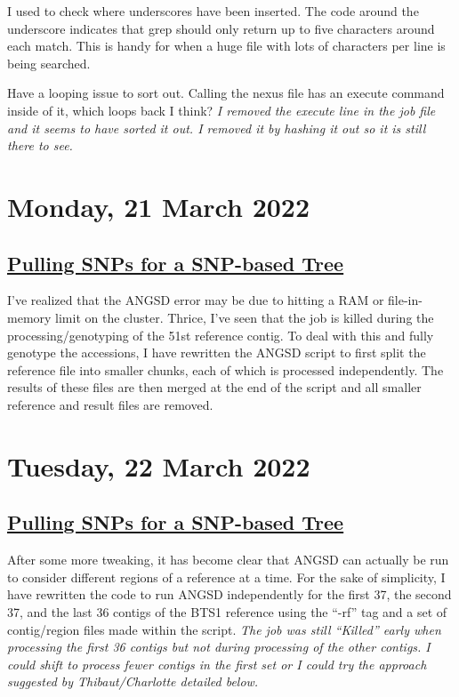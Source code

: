 \documentclass[12pt]{report}
\begin{document}
I used \verb!! to check where underscores have been inserted. The code around the underscore indicates that grep should only return up to five characters around each match. This is handy for when a huge file with lots of characters per line is being searched.

Have a looping issue to sort out. Calling the nexus file has an execute command inside of it, which loops back I think? \emph{I removed the execute line in the job file and it seems to have sorted it out. I removed it by hashing it out so it is still there to see.}

\section*{Monday, 21 March 2022}
\subsection*{\underline{Pulling SNPs for a SNP-based Tree}}

I've realized that the ANGSD error may be due to hitting a RAM or file-in-memory limit on the cluster. Thrice, I've seen that the job is killed during the processing/genotyping of the 51st reference contig. To deal with this and fully genotype the accessions, I have rewritten the ANGSD script to first split the reference file into smaller chunks, each of which is processed independently. The results of these files are then merged at the end of the script and all smaller reference and result files are removed.

\section*{Tuesday, 22 March 2022}
\subsection*{\underline{Pulling SNPs for a SNP-based Tree}}

After some more tweaking, it has become clear that ANGSD can actually be run to consider different regions of a reference at a time. For the sake of simplicity, I have rewritten the code to run ANGSD independently for the first 37, the second 37, and the last 36 contigs of the BTS1 reference using the ``-rf'' tag and a set of contig/region files made within the script. \emph{The job was still ``Killed'' early when processing the first 36 contigs but not during processing of the other contigs. I could shift to process fewer contigs in the first set or I could try the approach suggested by Thibaut/Charlotte detailed below.}
\end{document}
